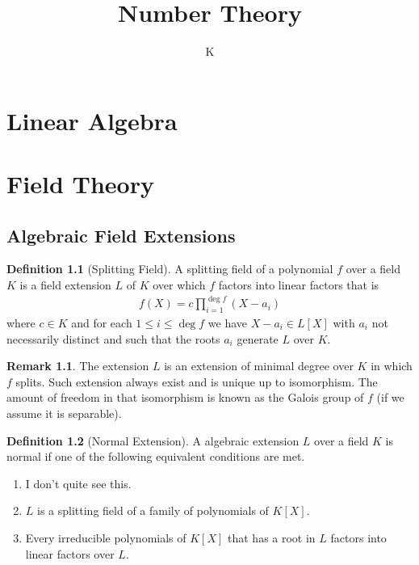 \documentclass[a4paper]{book}
\title{Number Theory}
\author{K}
\theoremstyle{definition}
\newtheorem{definition}{Definition}[]
\newtheorem*{remark}{Remark}
\begin{document}
\tableofcontents

\part{Linear Algebra}

\part{Field Theory}

\chapter{Algebraic Field Extensions}
\begin{defbox}
    \begin{definition}[Splitting Field]
        A splitting field of a polynomial \(f\) over a field \(K\) is a field extension \(L\) of \(K\) over which \(f\) factors into linear factors that is
        \begin{align*}
            f(X) = c \prod_{i=1}^{\deg f} (X - a_i)
        \end{align*}
        where \(c \in K\) and for each \(1 \leq i \leq \deg f\) we have \(X - a_i \in L[X]\) with \(a_i\) not necessarily distinct and such that the roots \(a_i\) generate \(L\) over \(K\).
    \end{definition}
\end{defbox}
\begin{remark}
    The extension \(L\) is an extension of minimal degree over \(K\) in which \(f\) splits. Such extension always exist and is unique up to isomorphism. The amount of freedom in that isomorphism is known as the Galois group of \(f\) (if we assume it is separable).
\end{remark}

\begin{defbox}
    \begin{definition}[Normal Extension]
        A algebraic extension \(L\) over a field \(K\) is normal if one of the following equivalent conditions are met.
        \begin{enumerate}
            \item I don't quite see this.
            \item \(L\) is a splitting field of a family of polynomials of \(K[X]\).
            \item Every irreducible polynomials of \(K[X]\) that has a root in \(L\) factors into linear factors over \(L\).
        \end{enumerate}
    \end{definition}
\end{defbox}
\end{document}
